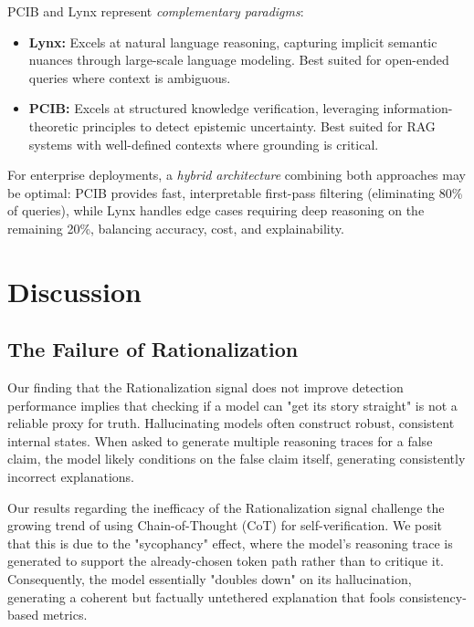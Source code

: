 \documentclass[11pt,letterpaper]{article}
\begin{document}
PCIB and Lynx represent \textit{complementary paradigms}:
\begin{itemize}[leftmargin=*,itemsep=0pt]
    \item \textbf{Lynx:} Excels at natural language reasoning, capturing implicit semantic nuances through large-scale language modeling. Best suited for open-ended queries where context is ambiguous.
    \item \textbf{PCIB:} Excels at structured knowledge verification, leveraging information-theoretic principles to detect epistemic uncertainty. Best suited for RAG systems with well-defined contexts where grounding is critical.
\end{itemize}

For enterprise deployments, a \textit{hybrid architecture} combining both approaches may be optimal: PCIB provides fast, interpretable first-pass filtering (eliminating 80\% of queries), while Lynx handles edge cases requiring deep reasoning on the remaining 20\%, balancing accuracy, cost, and explainability.

\section{Discussion}

\subsection{The Failure of Rationalization}
Our finding that the Rationalization signal does not improve detection performance implies that checking if a model can "get its story straight" is not a reliable proxy for truth. Hallucinating models often construct robust, consistent internal states. When asked to generate multiple reasoning traces for a false claim, the model likely conditions on the false claim itself, generating consistently incorrect explanations.

Our results regarding the inefficacy of the Rationalization signal challenge the growing trend of using Chain-of-Thought (CoT) for self-verification. We posit that this is due to the "sycophancy" effect, where the model's reasoning trace is generated to support the already-chosen token path rather than to critique it. Consequently, the model essentially "doubles down" on its hallucination, generating a coherent but factually untethered explanation that fools consistency-based metrics.
\end{document}
